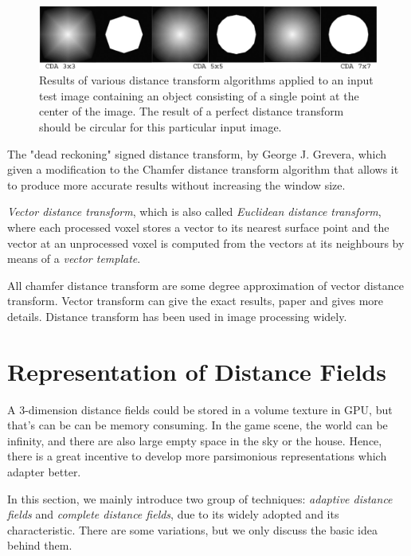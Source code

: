 \begin{figure}
	\includegraphics{graphics/df/multi-distance-transform}
	\caption{Results of various distance transform algorithms applied to an input test image containing an object consisting of a single point at the center of the image. The result of a perfect distance transform should be circular for this particular input image.}
	\label{f:multi-distance-transform}
\end{figure}

The "dead reckoning" signed distance transform, by George J. Grevera\cite[40.0mm]{a:dead-reckoning}, which given a modification to the Chamfer distance transform algorithm that allows it to produce more accurate results without increasing the window size. 

\textit{Vector distance transform}, which is also called \textit{Euclidean distance transform}, where each processed voxel stores a vector to its nearest surface point and the vector at an unprocessed voxel is computed from the vectors at its neighbours by means of a \textit{vector template}.

All chamfer distance transform are some degree approximation of vector distance transform. Vector transform can give the exact results, paper \cite{a:Euclidean-Distance-Mapping} and \cite[5mm]{a:Vector-City-VDT} gives more details. Distance transform has been used in image processing widely.


\section{Representation of Distance Fields}
A 3-dimension distance fields could be stored in a volume texture in GPU, but that's can be can be memory consuming. In the game scene, the world can be infinity, and there are also large empty space in the sky or the house. Hence, there is a great incentive to develop more parsimonious representations which adapter better.

In this section, we mainly introduce two group of techniques: \textit{adaptive distance fields} and \textit{complete distance fields}, due to its widely adopted and its characteristic. There are some variations, but we only discuss the basic idea behind them.

